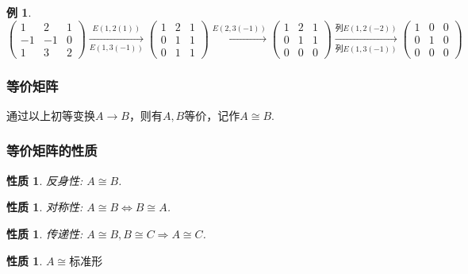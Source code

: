 \documentclass[12pt, a4paper, oneside]{ctexbook}
\newtheorem{example}[theorem]{例}
\newtheorem{quolity}[theorem]{性质}
\begin{document}
\begin{example}
    $\begin{pmatrix}
        1 & 2 & 1 \\
        -1 & -1 & 0 \\
        1 & 3 & 2
    \end{pmatrix} \xrightarrow[E(1,3(-1))]{E(1, 2(1))} \begin{pmatrix}
        1 & 2 & 1 \\
        0 & 1 & 1 \\
        0 & 1 & 1
    \end{pmatrix} \xrightarrow{E(2,3(-1))} \begin{pmatrix}
        1 & 2 & 1 \\
        0 & 1 & 1 \\
        0 & 0 & 0
    \end{pmatrix} \xrightarrow[\mbox{列}E(1,3(-1))]{\mbox{列}E(1,2(-2))} \begin{pmatrix}
        1 & 0 & 0 \\
        0 & 1 & 0 \\
        0 & 0 & 0
    \end{pmatrix}$
\end{example}

\subsubsection{等价矩阵}

通过以上初等变换$A \rightarrow B$，则有$A,B$等价，记作$A \cong B$. 

\subsubsection{等价矩阵的性质}

\begin{quolity}
    反身性: $A \cong B$. 
\end{quolity}

\begin{quolity}
    对称性: $A \cong B \Leftrightarrow B \cong A$. 
\end{quolity}

\begin{quolity}
    传递性: $A \cong B, B \cong C \Rightarrow A \cong C$. 
\end{quolity}

\begin{quolity}
    $A \cong \mbox{标准形}$
\end{quolity}
\end{document}
